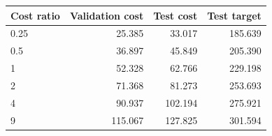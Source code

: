 \begin{tabular}{lrrr}
\toprule
Cost ratio & Validation cost & Test cost & Test target \\
\midrule
0.25 & 25.385 & 33.017 & 185.639 \\
0.5 & 36.897 & 45.849 & 205.390 \\
1 & 52.328 & 62.766 & 229.198 \\
2 & 71.368 & 81.273 & 253.693 \\
4 & 90.937 & 102.194 & 275.921 \\
9 & 115.067 & 127.825 & 301.594 \\
\bottomrule
\end{tabular}
